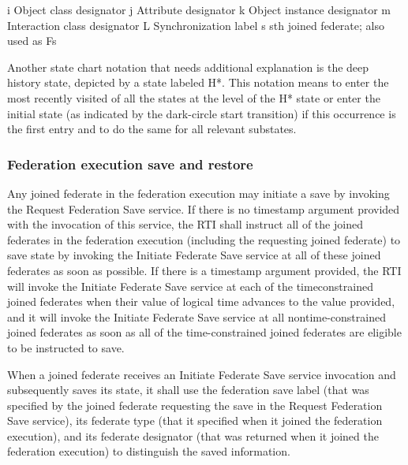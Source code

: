 i Object class designator j Attribute designator k Object instance designator m Interaction class designator L Synchronization label s sth joined federate; also used as Fs

Another state chart notation that needs additional explanation is the deep history state, depicted by a state labeled H*. This notation means to enter the most recently visited of all the states at the level of the H* state or enter the initial state (as indicated by the dark-circle start transition) if this occurrence is the first entry and to do the same for all relevant substates.

\clearpage

\vspace*{-0.35in}
\vspace*{-0.04in}

\subsubsection{Federation execution save and restore}

Any joined federate in the federation execution may initiate a save by invoking the Request Federation Save service. If there is no timestamp argument provided with the invocation of this service, the RTI shall instruct all of the joined federates in the federation execution (including the requesting joined federate) to save state by invoking the Initiate Federate Save \rtiinitiated{} service at all of these joined federates as soon as possible. If there is a timestamp argument provided, the RTI will invoke the Initiate Federate Save \rtiinitiated{} service at each of the timeconstrained joined federates when their value of logical time advances to the value provided, and it will invoke the Initiate Federate Save \rtiinitiated{} service at all nontime-constrained joined federates as soon as all of the time-constrained joined federates are eligible to be instructed to save.

When a joined federate receives an Initiate Federate Save \rtiinitiated{} service invocation and subsequently saves its state, it shall use the federation save label (that was specified by the joined federate requesting the save in the Request Federation Save service), its federate type (that it specified when it joined the federation execution), and its federate designator (that was returned when it joined the federation execution) to distinguish the saved information.

